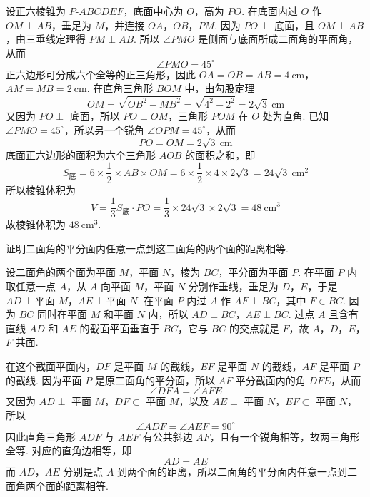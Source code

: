 \begin{solution}

设正六棱锥为 \(P\text{-}ABCDEF\)，底面中心为 \(O\)，高为 \(PO\). 在底面内过 \(O\) 作 \(OM\perp AB\)，垂足为 \(M\)，并连接 \(OA\)，\(OB\)，\(PM\). 因为 \(PO\perp\) 底面，且 \(OM\perp AB\)，由三垂线定理得 \(PM\perp AB\). 所以 \(\angle PMO\) 是侧面与底面所成二面角的平面角，从而
\[
\angle PMO=45^{\circ}
\]
正六边形可分成六个全等的正三角形，因此
\(OA=OB=AB=4\mathrm{~cm}\)，\(AM=MB=2\mathrm{~cm}\).
在直角三角形 \(BOM\) 中，由勾股定理
\[
OM=\sqrt{OB^{2}-MB^{2}}=\sqrt{4^{2}-2^{2}}=2\sqrt{3}\mathrm{~cm}
\]
又因为 \(PO\perp\) 底面，所以 \(PO\perp OM\)，三角形 \(POM\) 在 \(O\) 处为直角. 已知 \(\angle PMO=45^{\circ}\)，所以另一个锐角 \(\angle OPM=45^{\circ}\)，从而
\[
PO=OM=2\sqrt{3}\mathrm{~cm}
\]
底面正六边形的面积为六个三角形 \(AOB\) 的面积之和，即
\[
S_{\text{底}}=6\times\frac{1}{2}\times AB\times OM=6\times\frac{1}{2}\times4\times2\sqrt{3}=24\sqrt{3}\mathrm{~cm}^{2}
\]
所以棱锥体积为
\[
V=\frac{1}{3}S_{\text{底}}\cdot PO=\frac{1}{3}\times24\sqrt{3}\times2\sqrt{3}=48\mathrm{~cm}^{3}
\]
故棱锥体积为 \(48\mathrm{~cm}^{3}\).
\end{solution}

\begin{problem}
证明二面角的平分面内任意一点到这二面角的两个面的距离相等.
\end{problem}

\begin{solution}

设二面角的两个面为平面 \(M\)，平面 \(N\)，棱为 \(BC\)，平分面为平面 \(P\). 在平面 \(P\) 内取任意一点 \(A\)，从 \(A\) 向平面 \(M\)，平面 \(N\) 分别作垂线，垂足为 \(D\)，\(E\)，于是
\(AD\perp\text{平面 }M\)，\(AE\perp\text{平面 }N\).
在平面 \(P\) 内过 \(A\) 作 \(AF\perp BC\)，其中 \(F\in BC\). 因为 \(BC\) 同时在平面 \(M\) 和平面 \(N\) 内，所以 \(AD\perp BC\)，\(AE\perp BC\). 过点 \(A\) 且含有直线 \(AD\) 和 \(AE\) 的截面平面垂直于 \(BC\)，它与 \(BC\) 的交点就是 \(F\)，故 \(A\)，\(D\)，\(E\)，\(F\) 共面.

在这个截面平面内，\(DF\) 是平面 \(M\) 的截线，\(EF\) 是平面 \(N\) 的截线，\(AF\) 是平面 \(P\) 的截线. 因为平面 \(P\) 是原二面角的平分面，所以 \(AF\) 平分截面内的角 \(DFE\)，从而
\[
\angle DFA=\angle AFE
\]
又因为 \(AD\perp\) 平面 \(M\)，\(DF\subset\) 平面 \(M\)，以及 \(AE\perp\) 平面 \(N\)，\(EF\subset\) 平面 \(N\)，所以
\[
\angle ADF=\angle AEF=90^{\circ}
\]
因此直角三角形 \(ADF\) 与 \(AEF\) 有公共斜边 \(AF\)，且有一个锐角相等，故两三角形全等. 对应的直角边相等，即
\[
AD=AE
\]
而 \(AD\)，\(AE\) 分别是点 \(A\) 到两个面的距离，所以二面角的平分面内任意一点到二面角两个面的距离相等.
\end{solution}
